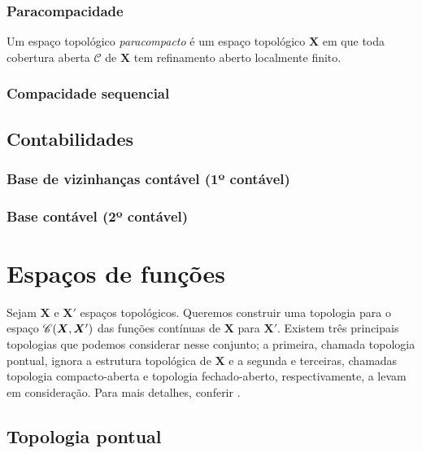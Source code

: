 \subsubsection{Paracompacidade}

\begin{definition}
Um espaço topológico \emph{paracompacto} é um espaço topológico $\bm X$ em que toda cobertura aberta $\mathcal C$ de $\bm X$ tem refinamento aberto localmente finito.
\end{definition}

\subsubsection{Compacidade sequencial}



\subsection{Contabilidades}

\subsubsection{Base de vizinhanças contável (1º contável)}

\subsubsection{Base contável (2º contável)}




\section{Espaços de funções}

Sejam $\bm X$ e $\bm X'$ espaços topológicos. Queremos construir uma topologia para o espaço $\mathscr{C}(\bm X, \bm X')$ das funções contínuas de $\bm X$ para $\bm X'$. Existem três principais topologias que podemos considerar nesse conjunto; a primeira, chamada topologia pontual, ignora a estrutura topológica de $\bm X$ e a segunda e terceiras, chamadas topologia compacto-aberta e topologia fechado-aberto, respectivamente, a levam em consideração. Para mais detalhes, conferir \cite{art:Arens-TopologiesforHomeomorphismGroups}.

\subsection{Topologia pontual}

